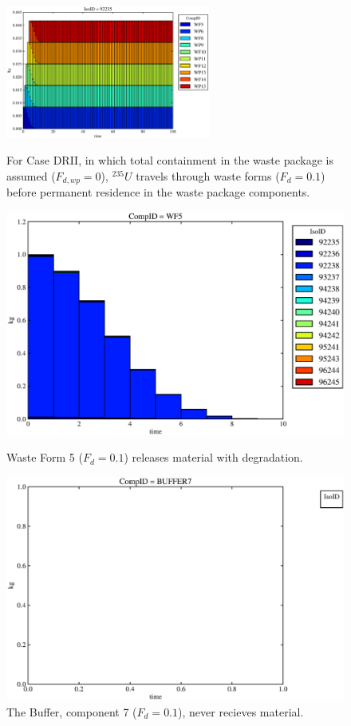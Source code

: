 \begin{figure}[ht]
\centering
\includegraphics[width=0.6\textwidth]{./chapters/demonstration/base/drII.eps}
\caption[$^{235}U$ residence. Degradation Rate Waste Package No Release.]{
For Case DRII, in which total containment in the waste package is assumed ($F_{d,wp}=0$), 
$^{235}U$ travels through waste forms ($F_d = 0.1$) before 
permanent residence in the waste package components.
}
\label{fig:drIIall}
\begin{minipage}[b]{0.45\linewidth}

  \includegraphics[width=\textwidth]{./chapters/demonstration/base/drII1.eps}
  \caption[Case DRII Waste Form Contaminants.]{
    Waste Form 5 ($F_d = 0.1$) releases material with degradation. 
    }
  \label{fig:drIIwf5}
  
  \includegraphics[width=\textwidth]{./chapters/demonstration/base/drII3.eps}
  \caption[Case DRII Buffer Contaminants]{
    The Buffer, component 7 ($F_d = 0.1$), never recieves material.
    }
  \label{fig:drIIbuff}


\end{minipage}
\end{figure}
